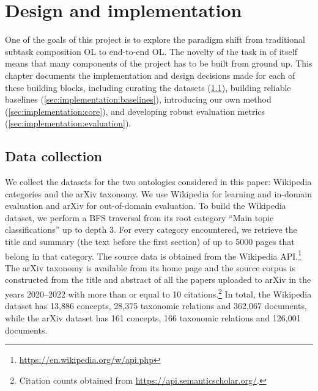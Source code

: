 \chapter{Design and implementation}

One of the goals of this project is to explore the paradigm shift from traditional subtask composition OL to end-to-end OL. The novelty of the task in of itself means that many components of the project has to be built from ground up. This chapter documents the implementation and design decisions made for each of these building blocks, including curating the datasets (\cref{sec:implementation:data-collection}), building reliable baselines (\cref{sec:implementation:baselines}), introducing our own method \name (\cref{sec:implementation:core}), and developing robust evaluation metrics (\cref{sec:implementation:evaluation}).



\section{Data collection}  \label{sec:implementation:data-collection}

We collect the datasets for the two ontologies considered in this paper: Wikipedia categories and the arXiv taxonomy. We use Wikipedia for learning and in-domain evaluation and arXiv for out-of-domain evaluation. To build the Wikipedia dataset, we perform a BFS traversal from its root category ``Main topic classifications'' up to depth 3. For every category encountered, we retrieve the title and summary (the text before the first section) of up to 5000 pages that belong in that category. The source data is obtained from the Wikipedia API.\footnote{\url{https://en.wikipedia.org/w/api.php}} The arXiv taxonomy is available from its home page and the source corpus is constructed from the title and abstract of all the papers uploaded to arXiv in the years 2020--2022 with more than or equal to 10 citations.\footnote{Citation counts obtained from \url{https://api.semanticscholar.org/}.} In total, the Wikipedia dataset has 13,886 concepts, 28,375 taxonomic relations and 362,067 documents, while the arXiv dataset has 161 concepts, 166 taxonomic relations and 126,001 documents.

